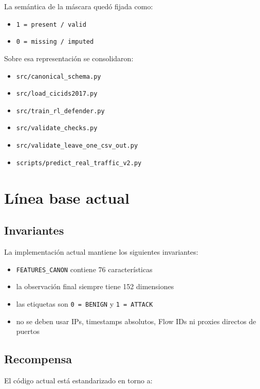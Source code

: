 \documentclass[12pt,a4paper]{report}
\begin{document}
La semántica de la máscara quedó fijada como:

\begin{itemize}
    \item \texttt{1 = present / valid}
    \item \texttt{0 = missing / imputed}
\end{itemize}

Sobre esa representación se consolidaron:

\begin{itemize}
    \item \texttt{src/canonical\_schema.py}
    \item \texttt{src/load\_cicids2017.py}
    \item \texttt{src/train\_rl\_defender.py}
    \item \texttt{src/validate\_checks.py}
    \item \texttt{src/validate\_leave\_one\_csv\_out.py}
    \item \texttt{scripts/predict\_real\_traffic\_v2.py}
\end{itemize}

\chapter{Línea base actual}

\section{Invariantes}

La implementación actual mantiene los siguientes invariantes:

\begin{itemize}
    \item \texttt{FEATURES\_CANON} contiene 76 características
    \item la observación final siempre tiene 152 dimensiones
    \item las etiquetas son \texttt{0 = BENIGN} y \texttt{1 = ATTACK}
    \item no se deben usar IPs, timestamps absolutos, Flow IDs ni proxies directos de puertos
\end{itemize}

\section{Recompensa}

El código actual está estandarizado en torno a:
\end{document}
